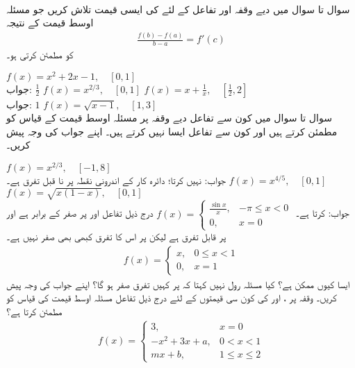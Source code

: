 \\
سوال  تا سوال  میں دیے وقفہ اور تفاعل کے لئے   کی ایسی قیمت  تلاش کریں جو مسئلہ اوسط قیمت کے نتیجہ 
\begin{align*}
\frac{f(b)-f(a)}{b-a}=f'(c)
\end{align*}
کو مطمئن کرتی ہو۔

$f(x)=x^2+2x-1,\quad [0,1]$\\
جواب:\quad
$\tfrac{1}{2}$
$f(x)=x^{2/3},\quad [0,1]$
$f(x)=x+\tfrac{1}{x},\quad [\tfrac{1}{2},2]$\\
جواب:\quad
$1$
$f(x)=\sqrt{x-1},\quad [1,3]$
\\
سوال  تا سوال  میں کون سے تفاعل دیے وقفہ پر مسئلہ اوسط قیمت کے قیاس کو مطمئن کرتے ہیں اور کون سے تفاعل ایسا نہیں کرتے ہیں۔ اپنے جواب کی وجہ پیش کریں۔ 

$f(x)=x^{2/3},\quad [-1,8]$\\
جواب:\quad
نہیں کرتا؛ دائرہ کار کے اندرونی نقطہ  پر  نا قبل تفرق ہے۔ 
$f(x)=x^{4/5},\quad [0,1]$
$f(x)=\sqrt{x(1-x)},\quad [0,1]$\\
جواب:\quad
کرتا ہے۔
$f(x)=\begin{cases} \tfrac{\sin x}{x},&-\pi\le x< 0\\ 0,&x=0 \end{cases}$
درج ذیل تفاعل  اور  پر صفر کے برابر ہے اور  پر قابل تفرق ہے لیکن  پر اس کا تفرق کبھی بھی صفر نہیں ہے۔ 
\begin{align*}
f(x)=\begin{cases} x,& 0\le x<1\\ 0,&x=1 \end{cases}
\end{align*}
ایسا کیوں ممکن ہے؟ کیا مسئلہ رول نہیں کہتا کہ  پر کہیں تفرق صفر ہو گا؟ اپنے جواب کی وجہ پیش کریں۔
وقفہ  پر ،  اور  کی کون سی قیمتوں کے لئے  درج ذیل تفاعل مسئلہ اوسط قیمت کی قیاس کو مطمئن کرتا ہے؟
\begin{align*}
f(x)=\begin{cases} 3,&x=0\\ -x^2+3x+a,&0<x<1\\ mx+b,&1\le x\le 2  \end{cases}
\end{align*}

